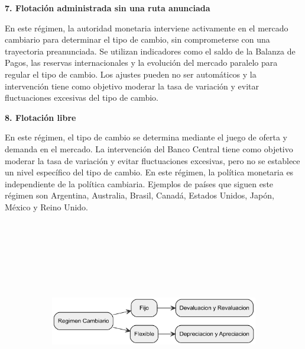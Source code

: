 \documentclass[
  a4paper,
]{article}
\begin{document}
\textbf{7. Flotación administrada sin una ruta anunciada}

En este régimen, la autoridad monetaria interviene activamente en el
mercado cambiario para determinar el tipo de cambio, sin comprometerse
con una trayectoria preanunciada. Se utilizan indicadores como el saldo
de la Balanza de Pagos, las reservas internacionales y la evolución del
mercado paralelo para regular el tipo de cambio. Los ajustes pueden no
ser automáticos y la intervención tiene como objetivo moderar la tasa de
variación y evitar fluctuaciones excesivas del tipo de cambio.

\textbf{8. Flotación libre}

En este régimen, el tipo de cambio se determina mediante el juego de
oferta y demanda en el mercado. La intervención del Banco Central tiene
como objetivo moderar la tasa de variación y evitar fluctuaciones
excesivas, pero no se establece un nivel específico del tipo de cambio.
En este régimen, la política monetaria es independiente de la política
cambiaria. Ejemplos de países que siguen este régimen son Argentina,
Australia, Brasil, Canadá, Estados Unidos, Japón, México y Reino Unido.

\begin{figure}

\caption{\label{fig-1}Regímenes cambiarios}

{\centering 

\begin{figure}[H]

{\centering \includegraphics[width=5.5in,height=3.5in]{index_files/figure-latex/dot-figure-1.png}

}

\end{figure}

}

\end{figure}
\end{document}
